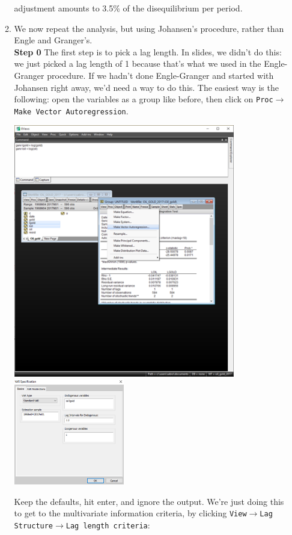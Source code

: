 \documentclass[11pt, a4paper]{article}
\begin{document}
\begin{enumerate}
\begin{enumerate}
adjustment amounts to 3.5\% of the disequilibrium per period.
\item We now repeat the analysis, but using Johansen's procedure, rather than Engle and Granger's. \\
\noindent\textbf{Step 0} The first step is to pick a lag length. In slides, we didn't do this: we just picked a lag length of 1 because that's what we used in the Engle-Granger procedure. If we hadn't done Engle-Granger and started with Johansen right away, we'd need a way to do this.
The easiest way is the following: open the variables as a group like before, then click on \texttt{Proc$\rightarrow$Make Vector Autoregression}.
\begin{center}
\includegraphics[width=0.8\textwidth]{johanseneviews1}
\includegraphics[width=0.4\textwidth]{johanseneviews2}
\end{center}
Keep the defaults, hit enter, and ignore the output. We're just doing this to get to the multivariate information criteria, by clicking \texttt{View$\rightarrow$Lag Structure$\rightarrow$Lag length criteria}:

\end{enumerate}
\end{enumerate}
\end{document}
